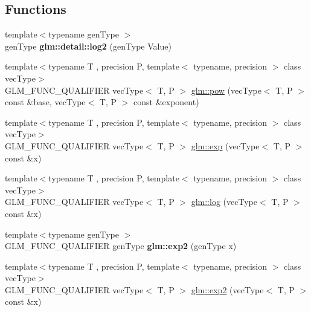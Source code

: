 \subsection*{Functions}
\begin{DoxyCompactItemize}
\item 
\mbox{\label{func__exponential_8inl_a3d24a612f2c5fa4f3aaf97dcd979ef1c}} 
{\footnotesize template$<$typename gen\+Type $>$ }\\gen\+Type {\bfseries glm\+::detail\+::log2} (gen\+Type Value)
\item 
{\footnotesize template$<$typename T , precision P, template$<$ typename, precision $>$ class vec\+Type$>$ }\\G\+L\+M\+\_\+\+F\+U\+N\+C\+\_\+\+Q\+U\+A\+L\+I\+F\+I\+ER vec\+Type$<$ T, P $>$ \hyperlink{group__core__func__exponential_ga082b332a4b7c6ad1d43e09ff19e214dd}{glm\+::pow} (vec\+Type$<$ T, P $>$ const \&base, vec\+Type$<$ T, P $>$ const \&exponent)
\item 
{\footnotesize template$<$typename T , precision P, template$<$ typename, precision $>$ class vec\+Type$>$ }\\G\+L\+M\+\_\+\+F\+U\+N\+C\+\_\+\+Q\+U\+A\+L\+I\+F\+I\+ER vec\+Type$<$ T, P $>$ \hyperlink{group__core__func__exponential_ga25e54a7f44fc49ec6ac6ffc7675cf04a}{glm\+::exp} (vec\+Type$<$ T, P $>$ const \&x)
\item 
{\footnotesize template$<$typename T , precision P, template$<$ typename, precision $>$ class vec\+Type$>$ }\\G\+L\+M\+\_\+\+F\+U\+N\+C\+\_\+\+Q\+U\+A\+L\+I\+F\+I\+ER vec\+Type$<$ T, P $>$ \hyperlink{group__core__func__exponential_ga21efca311e62d233de0ae96bab126b83}{glm\+::log} (vec\+Type$<$ T, P $>$ const \&x)
\item 
\mbox{\label{func__exponential_8inl_a8f6240c6756f850537398b1af2751c4b}} 
{\footnotesize template$<$typename gen\+Type $>$ }\\G\+L\+M\+\_\+\+F\+U\+N\+C\+\_\+\+Q\+U\+A\+L\+I\+F\+I\+ER gen\+Type {\bfseries glm\+::exp2} (gen\+Type x)
\item 
{\footnotesize template$<$typename T , precision P, template$<$ typename, precision $>$ class vec\+Type$>$ }\\G\+L\+M\+\_\+\+F\+U\+N\+C\+\_\+\+Q\+U\+A\+L\+I\+F\+I\+ER vec\+Type$<$ T, P $>$ \hyperlink{group__core__func__exponential_ga42ca440d9062f1f456f5a9e896378f9c}{glm\+::exp2} (vec\+Type$<$ T, P $>$ const \&x)

\end{DoxyCompactItemize}
